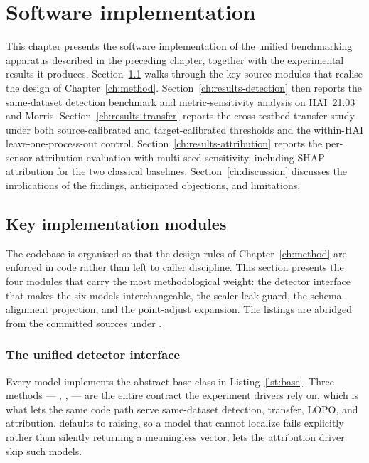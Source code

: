 \chapter{Software implementation}
\label{ch:implementation}

This chapter presents the software implementation of the unified benchmarking apparatus described in the preceding chapter, together with the experimental results it produces.  Section~\ref{sec:impl-modules} walks through the key source modules that realise the design of Chapter~\ref{ch:method}.  Section~\ref{ch:results-detection} then reports the same-dataset detection benchmark and metric-sensitivity analysis on HAI~21.03 and Morris.  Section~\ref{ch:results-transfer} reports the cross-testbed transfer study under both source-calibrated and target-calibrated thresholds and the within-HAI leave-one-process-out control.  Section~\ref{ch:results-attribution} reports the per-sensor attribution evaluation with multi-seed sensitivity, including SHAP attribution for the two classical baselines.  Section~\ref{ch:discussion} discusses the implications of the findings, anticipated objections, and limitations.

\section{Key implementation modules}
\label{sec:impl-modules}

The codebase is organised so that the design rules of Chapter~\ref{ch:method} are enforced in code rather than left to caller discipline.  This section presents the four modules that carry the most methodological weight: the detector interface that makes the six models interchangeable, the scaler-leak guard, the schema-alignment projection, and the point-adjust expansion.  The listings are abridged from the committed sources under .

\subsection{The unified detector interface}

Every model implements the abstract base class in Listing~\ref{lst:base}.  Three methods --- , ,  --- are the entire contract the experiment drivers rely on, which is what lets the same code path serve same-dataset detection, transfer, LOPO, and attribution.   defaults to raising, so a model that cannot localize fails explicitly rather than silently returning a meaningless vector;  lets the attribution driver skip such models.

